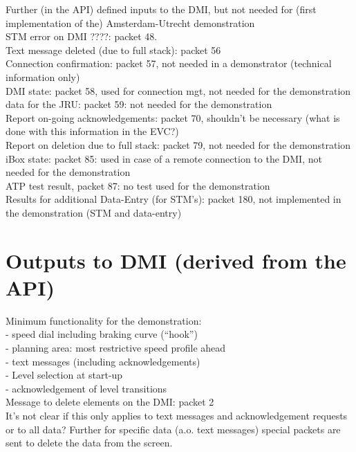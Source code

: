 \documentclass{template/openetcs_report}
\begin{document}
Further (in the API) defined inputs to the DMI, but not needed for (first implementation of the) Amsterdam-Utrecht demonstration\\
STM error on DMI ????: packet 48.\\
Text message deleted (due to full stack): packet 56\\
Connection confirmation: packet 57, not needed in a demonstrator (technical information only)\\
DMI state: packet 58, used for connection mgt, not needed for the demonstration\\
data for the JRU: packet 59: not needed for the demonstration\\
Report on-going acknowledgements: packet 70, shouldn't be necessary (what is done with this information in the EVC?)\\
Report on deletion due to full stack: packet 79, not needed for the demonstration\\
iBox state: packet 85: used in case of a remote connection to the DMI, not needed for the demonstration\\
ATP test result, packet 87: no test used for the demonstration\\
Results for additional Data-Entry (for STM's): packet 180, not implemented in the demonstration (STM and data-entry)\\

\section{Outputs to DMI (derived from the API)}

Minimum functionality for the demonstration:\\
- speed dial including braking curve (“hook”)\\
- planning area: most restrictive speed profile ahead\\
- text messages (including acknowledgements)\\
- Level selection at start-up\\
- acknowledgement of level transitions\\


Message to delete elements on the DMI: packet 2\\
It's not clear if this only applies to text messages and acknowledgement requests or to all data? Further for specific data (a.o. text messages) special packets are sent to delete the data from the screen.\\
\end{document}
